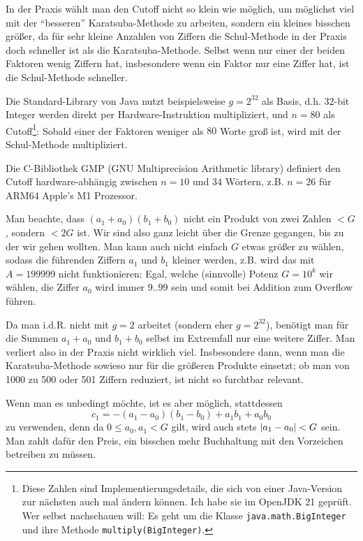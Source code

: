 \begin{remark}
    In der Praxis wählt man den Cutoff nicht so klein wie möglich, um möglichst viel mit der \enquote{besseren} Karatsuba-Methode zu arbeiten, sondern ein kleines bisschen größer, da für sehr kleine Anzahlen von Ziffern die Schul-Methode in der Praxis doch schneller ist als die Karatsuba-Methode. Selbst wenn nur einer der beiden Faktoren wenig Ziffern hat, insbesondere wenn ein Faktor nur eine Ziffer hat, ist die Schul-Methode schneller.

    \smallskip
    Die Standard-Library von Java nutzt beispielsweise $g=2^{32}$ als Basis, d.h. 32-bit Integer werden direkt per Hardware-Instruktion multipliziert, und $n=80$ als Cutoff\footnote{Diese Zahlen sind Implementierungsdetails, die sich von einer Java-Version zur nächsten auch mal ändern können. Ich habe sie im OpenJDK 21 geprüft. Wer selbst nachschauen will: Es geht um die Klasse \texttt{java.math.BigInteger} und ihre Methode \texttt{multiply(BigInteger)}.}: Sobald einer der Faktoren weniger als $80$ Worte groß ist, wird mit der Schul-Methode multipliziert.

    Die C-Bibliothek GMP (GNU Multiprecision Arithmetic library) definiert den Cutoff hardware-abhängig zwischen $n=10$ und $34$ Wörtern, z.B. $n=26$ für ARM64 Apple's M1 Prozessor.
\end{remark}

\begin{remark}
    Man beachte, dass $(a_1+a_0)(b_1+b_0)$ nicht ein Produkt von zwei Zahlen $<G$, sondern $<2G$ ist. Wir sind also ganz leicht über die Grenze gegangen, bis zu der wir gehen wollten. Man kann auch nicht einfach $G$ etwas größer zu wählen, sodass die führenden Ziffern $a_1$ und $b_1$ kleiner werden, z.B. wird das mit $A=199999$ nicht funktionieren: Egal, welche (sinnvolle) Potenz $G=10^k$ wir wählen, die Ziffer $a_0$ wird immer $9..99$ sein und somit bei Addition zum Overflow führen.

    \smallskip
    Da man i.d.R. nicht mit $g=2$ arbeitet (sondern eher $g=2^{32}$), benötigt man für die Summen $a_1+a_0$ und $b_1+b_0$ selbst im Extremfall nur eine weitere Ziffer. Man verliert also in der Praxis nicht wirklich viel. Insbesondere dann, wenn man die Karatsuba-Methode sowieso nur für die größeren Produkte einsetzt; ob man von 1000 zu 500 oder 501 Ziffern reduziert, ist nicht so furchtbar relevant.

    \medskip
    Wenn man es unbedingt möchte, ist es aber möglich, stattdessen
    \[c_1=-(a_1-a_0)(b_1-b_0)+a_1 b_1+a_0 b_0\]
    zu verwenden, denn da $0\leq a_0,a_1<G$ gilt, wird auch stets $\lvert a_1-a_0\rvert<G$ sein. Man zahlt dafür den Preis, ein bisschen mehr Buchhaltung mit den Vorzeichen betreiben zu müssen.
\end{remark}

